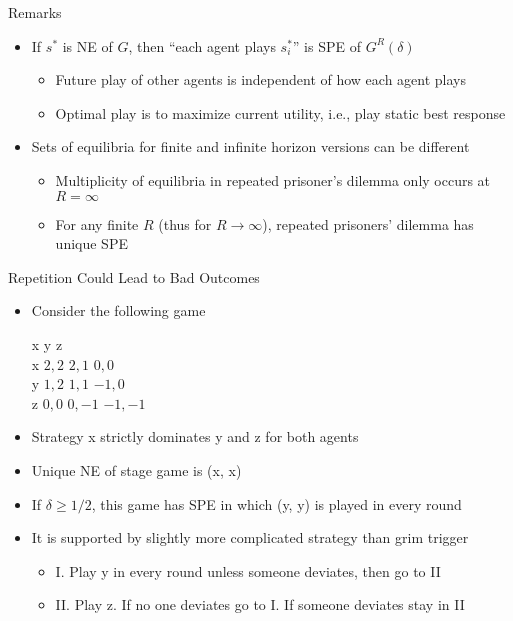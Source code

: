 \documentclass[11pt,aspectratio=169]{beamer}
\begin{document}
  \begin{frame}{Remarks}
   \begin{itemize}
   \setlength{\itemsep}{2em}
    \item If $s^{*}$ is NE of $G$, then ``each agent plays $s_i^{*}$'' is SPE of $G^{R}(\delta)$
    \begin{itemize}
     \item Future play of other agents is independent of how each agent plays
     \item Optimal play is to maximize current utility, i.e., play static best response
    \end{itemize} 
    \item Sets of equilibria for finite and infinite horizon versions can be \alert{different}
    \begin{itemize}
     \item Multiplicity of equilibria in repeated prisoner's dilemma only occurs at $R = \infty$
     \item For any finite $R$ (thus for $R \rightarrow \infty$), repeated prisoners' dilemma has unique SPE
    \end{itemize}
   \end{itemize}
  \end{frame}


  \begin{frame}{Repetition Could Lead to Bad Outcomes}
   \begin{itemize}
   \setlength{\itemsep}{0.5em}
    \item Consider the following game
    \begin{center}\scriptsize
     \hspace{-3.5em}
     \begin{game}{3}{3}
      	\> x 		\> y			\> z			\\
      x	\> $2, 2$	\> $2, 1$	\> $0, 0$	\\
      y	\> $1, 2$	\> $1, 1$	\> $-1, 0$	\\
      z	\> $0, 0$	\> $0, -1$	\> $-1, -1$
     \end{game}
    \end{center}
    \vspace{0.7em}
    \item Strategy x strictly dominates y and z for both agents
    \item Unique NE of stage game is (x, x)
    \item If $\delta \geq 1/2 $, this game has SPE in which (y, y) is played in every round
    \item It is supported by slightly more complicated strategy than grim trigger
    \begin{itemize}
     \item I. Play y in every round unless someone deviates, then go to II
     \item II. Play z. If no one deviates go to I. If someone deviates stay in II
    \end{itemize}
   \end{itemize}
  \end{frame}
  
\end{document}
